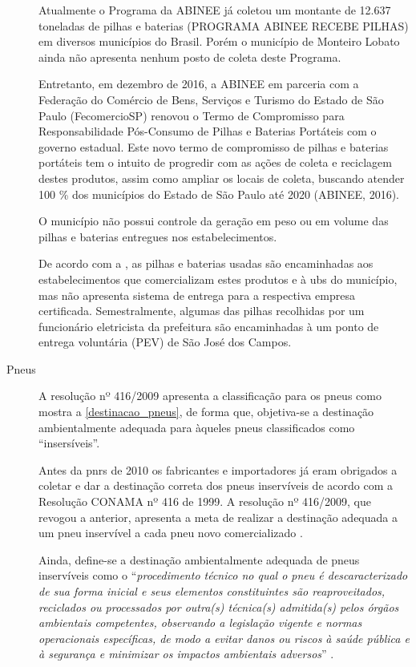 \begin{description}
		Atualmente o Programa da ABINEE já coletou um montante de 12.637 toneladas de pilhas e baterias (PROGRAMA ABINEE RECEBE PILHAS) em diversos municípios do Brasil. Porém o município de Monteiro Lobato ainda não apresenta nenhum posto de coleta deste Programa.
		
		Entretanto, em dezembro de 2016, a ABINEE em parceria com a Federação do Comércio de Bens, Serviços e Turismo do Estado de São Paulo (FecomercioSP) renovou o Termo de Compromisso para Responsabilidade Pós-Consumo de Pilhas e Baterias Portáteis com o governo estadual. Este novo termo de compromisso de pilhas e baterias portáteis tem o intuito de progredir com as ações de coleta e reciclagem destes produtos, assim como ampliar os locais de coleta, buscando atender 100 \% dos municípios do Estado de São Paulo até 2020 (ABINEE, 2016).
		
			O município não possui controle da geração em peso ou em volume das pilhas e baterias entregues nos estabelecimentos.
		
			De acordo com a , as pilhas e baterias usadas são encaminhadas aos estabelecimentos que comercializam estes produtos e à \gls{ubs} do município, mas não apresenta sistema de entrega para a respectiva empresa certificada. Semestralmente, algumas das pilhas recolhidas por um funcionário eletricista da prefeitura são encaminhadas à um ponto de entrega voluntária (PEV) de São José dos Campos.
		
		
		\item[Pneus] A resolução nº 416/2009 apresenta a classificação para os pneus como mostra a \autoref{destinacao_pneus}, de forma que, objetiva-se a destinação ambientalmente adequada para àqueles pneus classificados como “insersíveis”.	
	
		
	
		Antes da \gls{pnrs} de 2010 os fabricantes e importadores já eram obrigados a coletar e dar a destinação correta dos pneus inservíveis de acordo com a Resolução CONAMA nº 416 de 1999. A resolução nº 416/2009, que revogou a anterior, apresenta a meta de realizar a destinação adequada a um pneu inservível a cada pneu novo comercializado \cite{conama:416}.

		Ainda, define-se a destinação ambientalmente adequada de pneus inservíveis como o “\textit{procedimento técnico no qual o pneu é descaracterizado de sua forma inicial e seus elementos constituintes são reaproveitados, reciclados ou processados por outra(s) técnica(s) admitida(s) pelos órgãos ambientais competentes, observando a legislação vigente e normas operacionais específicas, de modo a evitar danos ou riscos à saúde pública e à segurança e minimizar os impactos ambientais adversos}” \cite{conama:416}. 
	

\end{description}
